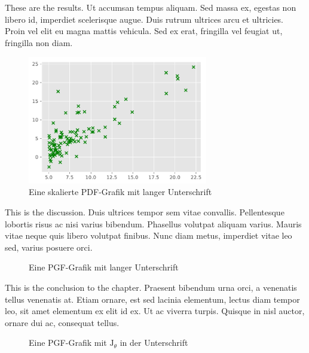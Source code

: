 These are the results. Ut accumsan tempus aliquam. Sed massa ex,
egestas non libero id, imperdiet scelerisque augue. Duis rutrum
ultrices arcu et ultricies. Proin vel elit eu magna mattis vehicula.
Sed ex erat, fringilla vel feugiat ut, fringilla non diam.

\begin{figure}[]
\hypertarget{ref_a_scaled_pdf_figure}{%
\centering
\includegraphics[width=0.70\textwidth]{assets/ex1_food_truck_profit.pdf}
\caption[Eine skalierte PDF-Grafik]{Eine skalierte PDF-Grafik mit langer Unterschrift
\autocite[vgl.][13]{Perez_PythonEcosystem_2011}}\label{ref_a_scaled_pdf_figure}
}
\end{figure}

This is the discussion. Duis ultrices tempor sem vitae convallis.
Pellentesque lobortis risus ac nisi varius bibendum. Phasellus
volutpat aliquam varius. Mauris vitae neque quis libero volutpat
finibus. Nunc diam metus, imperdiet vitae leo sed, varius posuere
orci.

\begin{figure}[]
\hypertarget{ref_a_pgf_figure}{%
\centering

\caption[Eine PGF-Grafik]{Eine PGF-Grafik mit langer Unterschrift}\label{ref_a_pgf_figure}
}
\end{figure}

This is the conclusion to the chapter. Praesent bibendum urna orci,
a venenatis tellus venenatis at. Etiam ornare, est sed lacinia
elementum, lectus diam tempor leo, sit amet elementum ex elit id ex.
Ut ac viverra turpis. Quisque in nisl auctor, ornare dui ac,
consequat tellus.

\begin{figure}[]
\hypertarget{ref_a_mathy_pgf_figure}{%
\centering

\caption[Eine PGF-Grafik mit \(\mathrm{J}_\theta\)]{Eine PGF-Grafik mit \(\mathrm{J}_\theta\) in der Unterschrift}\label{ref_a_mathy_pgf_figure}
}
\end{figure}

